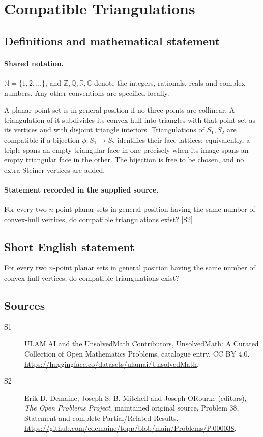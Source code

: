 \documentclass[11pt]{article}
\newcommand{\sref}[2]{\hyperlink{source:#1:#2}{[S#2]}}
\begin{document}
\section{Compatible Triangulations}\label{statement}

\subsection{Definitions and mathematical statement}

\paragraph{Shared notation.}$\mathbb N=\{1,2,\ldots\}$, and $\mathbb Z,\mathbb Q,\mathbb R,\mathbb C$ denote the integers, rationals, reals and complex numbers. Any other conventions are specified locally.


A planar point set is in general position if no three points are collinear. A triangulation of it subdivides its convex hull into triangles with that point set as its vertices and with disjoint triangle interiors. Triangulations of $S_1,S_2$ are compatible if a bijection $\phi:S_1\to S_2$ identifies their face lattices; equivalently, a triple spans an empty triangular face in one precisely when its image spans an empty triangular face in the other. The bijection is free to be chosen, and no extra Steiner vertices are added.
\paragraph{Statement recorded in the supplied source.}
For every two $n$-point planar sets in general position having the same number of convex-hull vertices, do compatible triangulations exist? \sref{statement}{2}
\subsection{Short English statement}
For every two $n$-point planar sets in general position having the same number of convex-hull vertices, do compatible triangulations exist?
\subsection{Sources}
\begin{description}
\item[\hypertarget{source:statement:1}{S1}] ULAM.AI and the UnsolvedMath Contributors, UnsolvedMath: A Curated Collection of Open Mathematics Problems, catalogue entry. CC BY 4.0. \url{https://huggingface.co/datasets/ulamai/UnsolvedMath}.
\item[\hypertarget{source:statement:2}{S2}] Erik D. Demaine, Joseph S. B. Mitchell and Joseph O\textquotesingle Rourke (editors), \emph{The Open Problems Project}, maintained original source, Problem 38, Statement and complete Partial/Related Results. \url{https://github.com/edemaine/topp/blob/main/Problems/P.000038}.
\end{description}
\label{end:statement}
\end{document}
